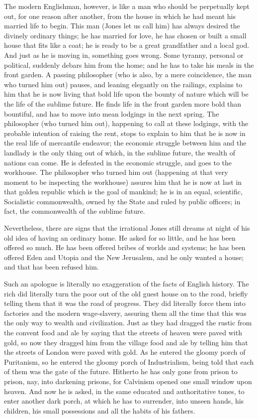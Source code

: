 \documentclass{book}
\begin{document}
The modern Englishman, however, is like a man who should be perpetually kept out, for one reason after another, from the house in which he had meant his married life to begin. This man (Jones let us call him) has always desired the divinely ordinary things; he has married for love, he has chosen or built a small house that fits like a coat; he is ready to be a great grandfather and a local god. And just as he is moving in, something goes wrong. Some tyranny, personal or political, suddenly debars him from the home; and he has to take his meals in the front garden. A passing philosopher (who is also, by a mere coincidence, the man who turned him out) pauses, and leaning elegantly on the railings, explains to him that he is now living that bold life upon the bounty of nature which will be the life of the sublime future. He finds life in the front garden more bold than bountiful, and has to move into mean lodgings in the next spring. The philosopher (who turned him out), happening to call at these lodgings, with the probable intention of raising the rent, stops to explain to him that he is now in the real life of mercantile endeavor; the economic struggle between him and the landlady is the only thing out of which, in the sublime future, the wealth of nations can come. He is defeated in the economic struggle, and goes to the workhouse. The philosopher who turned him out (happening at that very moment to be inspecting the workhouse) assures him that he is now at last in that golden republic which is the goal of mankind; he is in an equal, scientific, Socialistic commonwealth, owned by the State and ruled by public officers; in fact, the commonwealth of the sublime future.

Nevertheless, there are signs that the irrational Jones still dreams at night of his old idea of having an ordinary home. He asked for so little, and he has been offered so much. He has been offered bribes of worlds and systems; he has been offered Eden and Utopia and the New Jerusalem, and he only wanted a house; and that has been refused him.

Such an apologue is literally no exaggeration of the facts of English history. The rich did literally turn the poor out of the old guest house on to the road, briefly telling them that it was the road of progress. They did literally force them into factories and the modern wage-slavery, assuring them all the time that this was the only way to wealth and civilization. Just as they had dragged the rustic from the convent food and ale by saying that the streets of heaven were paved with gold, so now they dragged him from the village food and ale by telling him that the streets of London were paved with gold. As he entered the gloomy porch of Puritanism, so he entered the gloomy porch of Industrialism, being told that each of them was the gate of the future. Hitherto he has only gone from prison to prison, nay, into darkening prisons, for Calvinism opened one small window upon heaven. And now he is asked, in the same educated and authoritative tones, to enter another dark porch, at which he has to surrender, into unseen hands, his children, his small possessions and all the habits of his fathers.
\end{document}
